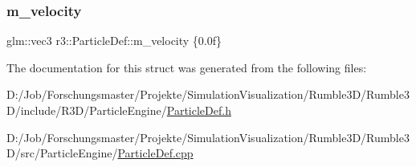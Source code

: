 \subsubsection{\texorpdfstring{m\+\_\+velocity}{m\_velocity}}
{\footnotesize\ttfamily glm\+::vec3 r3\+::\+Particle\+Def\+::m\+\_\+velocity \{0.\+0f\}}



The documentation for this struct was generated from the following files\+:\begin{DoxyCompactItemize}
\item 
D\+:/\+Job/\+Forschungsmaster/\+Projekte/\+Simulation\+Visualization/\+Rumble3\+D/\+Rumble3\+D/include/\+R3\+D/\+Particle\+Engine/\mbox{\hyperlink{_particle_def_8h}{Particle\+Def.\+h}}\item 
D\+:/\+Job/\+Forschungsmaster/\+Projekte/\+Simulation\+Visualization/\+Rumble3\+D/\+Rumble3\+D/src/\+Particle\+Engine/\mbox{\hyperlink{_particle_def_8cpp}{Particle\+Def.\+cpp}}\end{DoxyCompactItemize}
